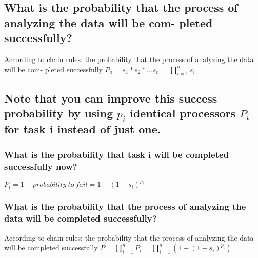 \documentclass{article}
\begin{document}
\subsection{What is the probability that the process of analyzing the data will be com-
pleted successfully?}
According to chain rules:  the probability that the process of analyzing the data will be com-
pleted successfully $P_a=s_1*s_2*...s_n=\prod_{i=1}^n s_i$\\
\subsection{Note that you can improve this success probability by using $p_i$ identical processors $P_i$
for task i instead of just one.}
\subsubsection{What is the probability that task i will be completed successfully now?}
$P_i = 1- probability\ to\ fail = 1- (1-s_i)^{p_i}$
\subsubsection{What is the probability that the process of analyzing the data will be completed successfully?}
According to chain rules: the probability that the process of analyzing the data will be completed successfully $P = \prod_{i=1}^n P_i = \prod_{i=1}^n (1-(1-s_i)^{p_i})$
\end{document}
